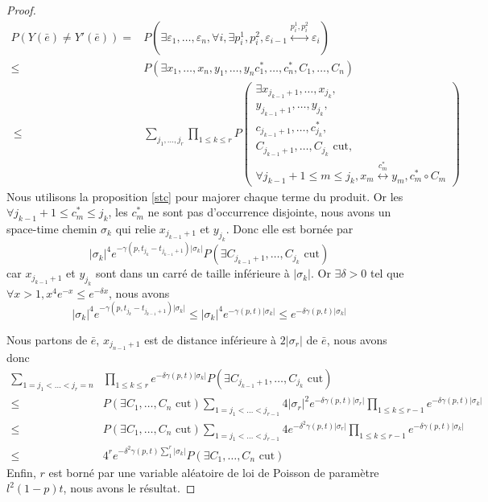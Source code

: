 \documentclass[titlepage,a4paper,12pt]{article}
\newcounter{prop}
\begin{document}
\begin{proof}
\begin{align*}
P(Y(\bar{e})\neq Y'(\bar{e})) =& P(\exists \varepsilon_1,\dots,\varepsilon_n, \forall i, \exists p_i^1,p_i^2, \varepsilon_{i-1}\overset{p_i^1,p_i^2}{\longleftrightarrow}\varepsilon_i) \\
 \leqslant &P(\exists x_1,\dots,x_n,y_1,\dots,y_n c^*_1,\dots,c^*_n,C_1,\dots,C_n) \\\
 \leqslant &\sum_{j_1,\dots,j_r}\prod_{1\leqslant k \leqslant r} P\left(\begin{array}{c}
 \exists x_{j_{k-1}+1},\dots,x_{j_k},\\
 y_{j_{k-1}+1},\dots,y_{j_k},\\
 c_{j_{k-1}+1},\dots,c^*_{j_k},\\
 C_{j_{k-1}+1},\dots,C_{j_k} \text{ cut},\\
 \forall j_{k-1}+1 \leqslant m \leqslant j_k, x_m\overset{c^*_m}{\longleftrightarrow} y_m, 
 c^*_m\circ C_m
 \end{array}
 \right)
\end{align*}
Nous utilisons la proposition \ref{stc} pour majorer chaque terme du produit. Or les $\forall j_{k-1}+1 \leqslant c^*_m \leqslant j_k$, les $c^*_m$ ne sont pas d'occurrence disjointe, nous avons un space-time chemin $\sigma_k$ qui relie $x_{j_{k-1}+1}$ et $y_{j_k}$. Donc elle est bornée par $$ \displaystyle |\sigma_k|^4 e^{-\gamma(p,t_{j_k}-t_{j_{k-1}+1})|\sigma_k|} P(\exists C_{j_{k-1}+1},\dots,C_{j_k} \text{ cut})$$ car $x_{j_{k-1}+1}$ et $y_{j_k}$ sont dans un carré de taille inférieure à $ |\sigma_k|$. Or $\exists \delta>0$ tel que $\forall x>1, x^4e^{-x} \leqslant e^{-\delta x}$, nous avons 
$$|\sigma_k|^4 e^{-\gamma(p,t_{j_k}-t_{j_{k-1}+1})|\sigma_k|} \leqslant |\sigma_k|^4 e^{-\gamma(p,t)|\sigma_k|} \leqslant e^{-\delta\gamma(p,t)|\sigma_k|}$$

Nous partons de $\bar{e}$, $x_{j_{n-1}+1}$ est de distance inférieure à $2|\sigma_r|$ de $\bar{e}$, nous avons donc 
\begin{align*}\sum_{1=j_1<\dots < j_r = n} &\prod_{1\leqslant k \leqslant r} e^{-\delta \gamma(p,t)|\sigma_k|} P(\exists C_{j_{k-1}+1},\dots,C_{j_k} \text{ cut}) \\
\leqslant & P(\exists C_1,\dots,C_n \text{ cut})\sum_{1=j_1<\dots < j_{r-1}} 4|\sigma_r|^2e^{-\delta \gamma(p,t)|\sigma_r|}\prod_{1\leqslant k \leqslant r-1}e^{-\delta \gamma(p,t)|\sigma_k|} \\
\leqslant & P(\exists C_1,\dots,C_n \text{ cut})\sum_{1=j_1<\dots < j_{r-1}} 4e^{-\delta^2 \gamma(p,t)|\sigma_r|}\prod_{1\leqslant k \leqslant r-1}e^{-\delta \gamma(p,t)|\sigma_k|} \\
\leqslant & 4^r e^{-\delta^2 \gamma(p,t)\sum_1^r|\sigma_k|}P(\exists C_1,\dots,C_n \text{ cut})
\end{align*}
Enfin, $r$ est borné par une variable aléatoire de loi de Poisson de paramètre $l^2 (1-p) t$, nous avons le résultat.
\end{proof}
\end{document}

